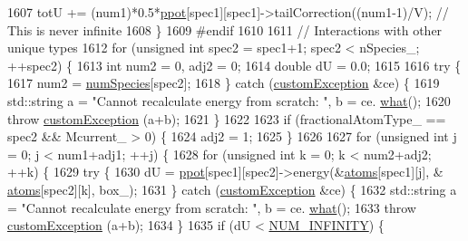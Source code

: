 \begin{DoxyCode}
1607             totU += (num1)*0.5*\hyperlink{classsim_system_ad2e290b5963f132e6a3a56cee35c8e9f}{ppot}[spec1][spec1]->tailCorrection((num1-1)/V); \textcolor{comment}{// This is never
       infinite}
1608         \}
1609 \textcolor{preprocessor}{#endif}
1610 \textcolor{preprocessor}{}
1611         \textcolor{comment}{// Interactions with other unique types}
1612         \textcolor{keywordflow}{for} (\textcolor{keywordtype}{unsigned} \textcolor{keywordtype}{int} spec2 = spec1+1; spec2 < nSpecies\_; ++spec2) \{
1613             \textcolor{keywordtype}{int} num2 = 0, adj2 = 0;
1614             \textcolor{keywordtype}{double} dU = 0.0;
1615 
1616             \textcolor{keywordflow}{try} \{
1617                 num2 = \hyperlink{classsim_system_a9eea865e6dc1cff377b1e79c4d9c23f0}{numSpecies}[spec2];
1618             \} \textcolor{keywordflow}{catch} (\hyperlink{classcustom_exception}{customException} &ce) \{
1619                 std::string a = \textcolor{stringliteral}{"Cannot recalculate energy from scratch: "}, b = ce.
      \hyperlink{classcustom_exception_aeb6ab5848b038adfc68fde86a512f691}{what}();
1620                 \textcolor{keywordflow}{throw} \hyperlink{classcustom_exception}{customException} (a+b);
1621             \}
1622 
1623             \textcolor{keywordflow}{if} (fractionalAtomType\_ == spec2 && Mcurrent\_ > 0) \{
1624                 adj2 = 1;
1625             \}
1626 
1627             \textcolor{keywordflow}{for} (\textcolor{keywordtype}{unsigned} \textcolor{keywordtype}{int} j = 0; j < num1+adj1; ++j) \{
1628                 \textcolor{keywordflow}{for} (\textcolor{keywordtype}{unsigned} \textcolor{keywordtype}{int} k = 0; k < num2+adj2; ++k) \{
1629                     \textcolor{keywordflow}{try} \{
1630                         dU = \hyperlink{classsim_system_ad2e290b5963f132e6a3a56cee35c8e9f}{ppot}[spec1][spec2]->energy(&\hyperlink{classsim_system_a90421b19082f7fb8fc23b7264b1161e4}{atoms}[spec1][j], &
      \hyperlink{classsim_system_a90421b19082f7fb8fc23b7264b1161e4}{atoms}[spec2][k], box\_);
1631                     \} \textcolor{keywordflow}{catch} (\hyperlink{classcustom_exception}{customException} &ce) \{
1632                         std::string a = \textcolor{stringliteral}{"Cannot recalculate energy from scratch: "}, b = ce.
      \hyperlink{classcustom_exception_aeb6ab5848b038adfc68fde86a512f691}{what}();
1633                         \textcolor{keywordflow}{throw} \hyperlink{classcustom_exception}{customException} (a+b);
1634                     \}
1635                     \textcolor{keywordflow}{if} (dU < \hyperlink{potentials_8h_ab94ab1d09e2291d03fe92a0e24a9d33b}{NUM\_INFINITY}) \{

\end{DoxyCode}
